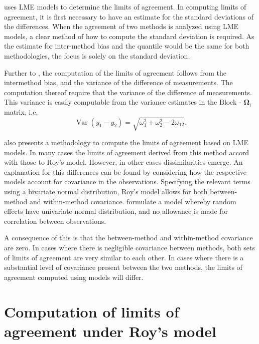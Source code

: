\documentclass[12pt, a4paper]{report}
\theoremstyle{plain}
\theoremstyle{definition}
\theoremstyle{remark}
\begin{document}
	\newpage


			
	
	\bigskip
	\citet{BXC2008} uses LME models to determine the limits of agreement.  In computing limits of agreement, it is first necessary to have an estimate for the standard deviations of the differences. When the agreement of two methods is analyzed using LME models, a clear method of how to compute the standard deviation is required. As the estimate for inter-method bias and the quantile would be the same for both methodologies, the focus is solely on the standard deviation.
	
Further to \citet{BA86}, the computation of the limits of agreement follows from the intermethod bias, and the variance of the difference of measurements. 	The computation thereof require that the variance of the difference of measurements. This variance is easily computable from the  variance estimates in the ${\mbox{Block - }\boldsymbol \Omega_{i}}$ matrix, i.e.
\[
\operatorname{Var}(y_1 - y_2) = \sqrt{ \omega^2_1 + \omega^2_2 - 2\omega_{12}}.
\]
	
	\citet{BXC2008} also presents a methodology to compute the limits of agreement based on LME models. In many cases the limits of agreement derived from this method accord with those to Roy's model. However, in other cases dissimilarities emerge. An explanation for this differences can be found by considering how the respective models account for covariance in the observations. Specifying the relevant terms using a bivariate normal distribution, Roy's model allows for both between-method and within-method covariance. \citet{BXC2008} formulate a model whereby random effects have univariate normal distribution, and no allowance is made for correlation between observations.
	
	A consequence of this is that the between-method and within-method covariance are zero. In cases where there is negligible covariance between methods, both sets of limits of agreement are very similar to each other. In cases where there is a substantial level of covariance present between the two methods, the limits of agreement computed using models will differ.
	


	
	\section{Computation of limits of agreement under Roy's model}
\end{document}
